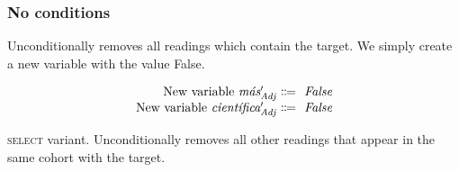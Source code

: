 

\subsubsection{No conditions} 


 Unconditionally removes all readings which contain the target. We simply create a new variable with the value False.

\begin{equation}
\centering
%
\begin{array}{r @{~\eqdef~} l}
    \text{New variable } \mas{}'_\adj         & \text{ \em False} \\
    \text{New variable } \cientifica{}'_\adj  & \text{ \em False} \\
  \end{array}
\end{equation}

 \textsc{select} variant. Unconditionally removes all other readings that appear in the same cohort with the target.

